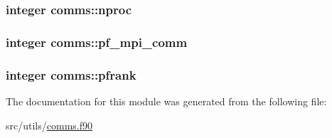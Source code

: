 \hypertarget{classcomms_a4d6c1b5d6aa807f60683ccf2cdb89644}{
\subsubsection[{nproc}]{\setlength{\rightskip}{0pt plus 5cm}integer comms\-::nproc}}\label{classcomms_a4d6c1b5d6aa807f60683ccf2cdb89644}
\hypertarget{classcomms_a86ca20605ce853814b00dd91fdd0db89}{
\subsubsection[{pf\-\_\-mpi\-\_\-comm}]{\setlength{\rightskip}{0pt plus 5cm}integer comms\-::pf\-\_\-mpi\-\_\-comm}}\label{classcomms_a86ca20605ce853814b00dd91fdd0db89}
\hypertarget{classcomms_ac714c7b76943c8057f54dc27bd5575fb}{
\subsubsection[{pfrank}]{\setlength{\rightskip}{0pt plus 5cm}integer comms\-::pfrank}}\label{classcomms_ac714c7b76943c8057f54dc27bd5575fb}


The documentation for this module was generated from the following file\-:\begin{DoxyCompactItemize}
\item 
src/utils/\hyperlink{comms_8f90}{comms.\-f90}\end{DoxyCompactItemize}
